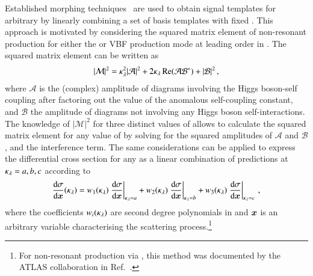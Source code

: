 Established morphing techniques~\cite{ATL-PHYS-PUB-2015-047} are used
to obtain signal templates for arbitrary \klambda by linearly
combining a set of basis templates with fixed \klambda. This approach
is motivated by considering the squared matrix element of non-resonant
\HH production for either the \ggF or VBF production mode at leading
order in \klambda. The squared matrix element can be written as
\begin{align*}
  |\mathcal{M}|^2 = \kappa_{\lambda}^2 |\mathcal{A}|^2 + 2 \kappa_{\lambda} \operatorname{Re}(\mathcal{A} \mathcal{B}^*) + |\mathcal{B}|^2 \,\text{,}
\end{align*}
where $\mathcal{A}$ is the (complex) amplitude of diagrams involving
the Higgs boson-self coupling after factoring out the value of the
anomalous self-coupling constant, and $\mathcal{B}$ the amplitude of
diagrams not involving any Higgs boson self-interactions. The
knowledge of $|\mathcal{M}|^2$ for three distinct values of \klambda
allows to calculate the squared matrix element for any value of
\klambda by solving for the squared amplitudes of $\mathcal{A}$ and
$\mathcal{B}$, and the interference term. The same considerations can
be applied to express the differential cross section for any \klambda
as a linear combination of predictions at $\kappa_{\lambda} = a, b, c$
according to
\begin{align*}
  \frac{\mathrm{d}\sigma}{\mathrm{d}\bm{x}}(\kappa_{\lambda})
  = w_1(\kappa_{\lambda}) \left. \frac{\mathrm{d}\sigma}{\mathrm{d}\bm{x}} \right|_{\kappa_{\lambda} = a}
  + w_2(\kappa_{\lambda}) \left. \frac{\mathrm{d}\sigma}{\mathrm{d}\bm{x}} \right|_{\kappa_{\lambda} = b}
  + w_3(\kappa_{\lambda}) \left. \frac{\mathrm{d}\sigma}{\mathrm{d}\bm{x}} \right|_{\kappa_{\lambda} = c} \,\text{,}
\end{align*}
where the coefficients $w_i(\kappa_{\lambda})$ are second degree polynomials
in \klambda and $\bm{x}$ is an arbitrary variable characterising
the scattering process.\footnote{For non-resonant \HH production via
  \ggF, this method was documented by the ATLAS collaboration in
  Ref.~\cite{ATL-PHYS-PUB-2019-007}.}

